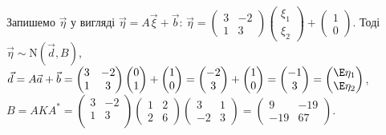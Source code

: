 \begin{example}
\begin{enumerate}
        Запишемо $\vec{\eta}$ у вигляді $\vec{\eta} = A\vec{\xi} + \vec{b}$: $\vec{\eta} = \begin{pmatrix}
            3 & -2 \\
            1 & 3 
        \end{pmatrix}\begin{pmatrix}
            \xi_1 \\ \xi_2
        \end{pmatrix} + \begin{pmatrix}
            1 \\ 0 
        \end{pmatrix}$. Тоді $\vec{\eta} \sim \mathrm{N}(\vec{d}, B)$,
        $\vec{d} = A\vec{a} + \vec{b} = \begin{pmatrix}
            3 & -2 \\
            1 & 3 \\
        \end{pmatrix}\begin{pmatrix}
            0 \\ 1
        \end{pmatrix} + \begin{pmatrix}
            1 \\ 0 
        \end{pmatrix} = \begin{pmatrix}
            -2 \\ 3 
        \end{pmatrix} + \begin{pmatrix}
            1 \\ 0
        \end{pmatrix} = \begin{pmatrix}
            -1 \\ 3
        \end{pmatrix} = \begin{pmatrix}
            \E\eta_1 \\ \E\eta_2
        \end{pmatrix}$, $B=A K A^{*} = \begin{pmatrix}
            3 & -2 \\
            1 & 3 \\
        \end{pmatrix}\begin{pmatrix}
            1 & 2 \\
            2 & 6
        \end{pmatrix}\begin{pmatrix}
            3 & 1 \\
            -2 & 3
        \end{pmatrix} = \begin{pmatrix}
            9 & -19 \\
            -19 & 67
        \end{pmatrix}$.


\end{enumerate}
\end{example}
